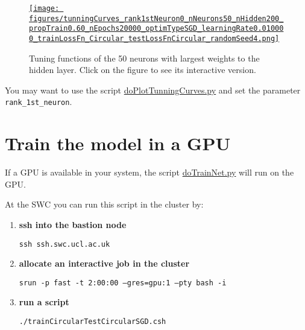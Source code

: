 \documentclass[12pt]{article}
\begin{document}
\begin{figure}[H]
    \begin{center}
        \href{https://www.gatsby.ucl.ac.uk/~rapela/statNeuro/2025/worksheets/08_artificialNeuralNetworks/figures/tunningCurves_rank1stNeuron0_nNeurons50_nHidden200_propTrain0.60_nEpochs20000_optimTypeSGD_learningRate0.010000_trainLossFn_Circular_testLossFnCircular_randomSeed4.html}{\texttt{[image: figures/tunningCurves\_rank1stNeuron0\_nNeurons50\_nHidden200\_propTrain0.60\_nEpochs20000\_optimTypeSGD\_learningRate0.010000\_trainLossFn\_Circular\_testLossFnCircular\_randomSeed4.png]}}

        \caption{Tuning functions of the 50 neurons with largest weights to the
        hidden layer. Click on the figure to see its interactive version.}

        \label{fig:tunningFunctionsFirst50}
    \end{center}
\end{figure}


You may want to use the script
\href{https://github.com/joacorapela/statNeuro2025/blob/master/worksheets/08_artificialNeuralNetworks/code/scripts/doPlotTunningCurves.py}{doPlotTunningCurves.py}
and set the parameter \texttt{rank\_1st\_neuron}.

\section{Train the model in a GPU}

If a GPU is available in your system, the script
\href{https://github.com/joacorapela/statNeuro2025/blob/master/worksheets/08_artificialNeuralNetworks/code/scripts/doTrainNet.py}{doTrainNet.py}
will run on the GPU.

At the SWC you can run this script in the cluster by:

\begin{enumerate}

    \item \textbf{ssh into the bastion node}

        \texttt{ssh ssh.swc.ucl.ac.uk}

    \item \textbf{allocate an interactive job in the cluster}

        \texttt{srun -p fast -t 2:00:00 --gres=gpu:1 --pty bash -i}

    \item \textbf{run a script}

        \texttt{./trainCircularTestCircularSGD.csh}

\end{enumerate}
\end{document}

